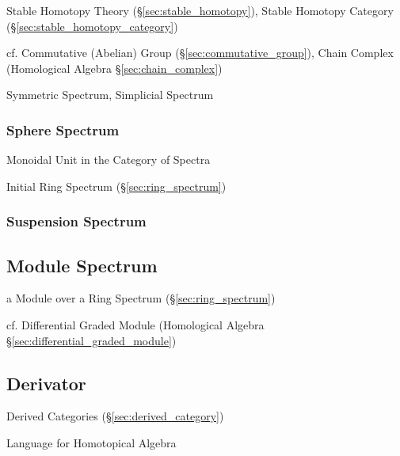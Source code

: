 Stable Homotopy Theory (\S\ref{sec:stable_homotopy}), Stable Homotopy Category
(\S\ref{sec:stable_homotopy_category})

cf. Commutative (Abelian) Group (\S\ref{sec:commutative_group}), Chain Complex
(Homological Algebra \S\ref{sec:chain_complex})

Symmetric Spectrum, Simplicial Spectrum



\subsubsection{Sphere Spectrum}\label{sec:sphere_spectrum}

Monoidal Unit in the Category of Spectra

Initial Ring Spectrum (\S\ref{sec:ring_spectrum})



\subsubsection{Suspension Spectrum}\label{sec:suspension_spectrum}



\subsection{Module Spectrum}\label{sec:module_spectrum}

a Module over a Ring Spectrum (\S\ref{sec:ring_spectrum})

cf. Differential Graded Module (Homological Algebra
\S\ref{sec:differential_graded_module})



\subsection{Derivator}\label{sec:derivator}

Derived Categories (\S\ref{sec:derived_category})

Language for Homotopical Algebra



